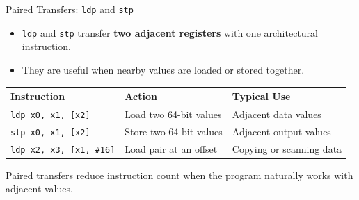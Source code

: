 \documentclass[aspectratio=169,11pt,t]{beamer}
\newcommand{\key}[1]{\textbf{#1}}
\newcommand{\code}[1]{\texttt{#1}}
\begin{document}

\begin{frame}{Paired Transfers: \texttt{ldp} and \texttt{stp}}
\large
\begin{itemize}\setlength{\itemsep}{6pt}
  \item \code{ldp} and \code{stp} transfer \key{two adjacent registers} with one architectural instruction.
  \item They are useful when nearby values are loaded or stored together.
\end{itemize}

\vspace{0.2cm}
\begin{center}
\small
\setlength{\tabcolsep}{7pt}
\begin{tabular}{lll}
\toprule
\textbf{Instruction} & \textbf{Action} & \textbf{Typical Use} \\
\midrule
\code{ldp x0, x1, [x2]} & Load two 64-bit values & Adjacent data values \\
\code{stp x0, x1, [x2]} & Store two 64-bit values & Adjacent output values \\
\code{ldp x2, x3, [x1, \#16]} & Load pair at an offset & Copying or scanning data \\
\bottomrule
\end{tabular}
\end{center}

\vspace{0.2cm}
\normalsize
Paired transfers reduce instruction count when the program naturally works with adjacent values.
\end{frame}

\end{document}
